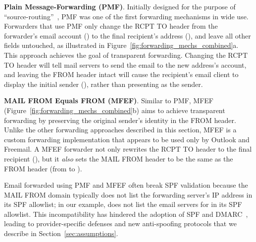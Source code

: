 
\textbf{Plain Message-Forwarding (PMF)}. Initially designed for
the purpose of ``source-routing''~\cite{Emailfor45:online}, PMF was
one of the first forwarding mechanisms in wide use.
Forwarders that use PMF only change
the \textsc{RCPT TO} header from the forwarder's email account () to the final recipient's address (), and leave all other fields
untouched,
as illustrated in Figure~\ref{fig:forwarding_mechs_combined}a.
This approach achieves the goal of transparent forwarding.
Changing the \textsc{RCPT TO} header will tell mail servers to send the email to the new address's account, and leaving the \textsc{FROM} header intact will
cause the recipient's email client to display the initial sender (),
rather than presenting  as the sender.


\textbf{MAIL FROM Equals FROM (MFEF)}.
Similar to PMF, MFEF (Figure~\ref{fig:forwarding_mechs_combined}b) aims to achieve transparent forwarding by preserving the original sender's identity in the \textsc{FROM} header.
Unlike the other forwarding approaches described in this section, MFEF is a custom forwarding implementation that appears to be used only by Outlook and Freemail.
A MFEF forwarder not only rewrites the \textsc{RCPT TO} header to the final recipient (), but it \emph{also} sets the \textsc{MAIL FROM}
header to be the same as the \textsc{FROM} header (from  to ).

Email forwarded using PMF and MFEF often break SPF validation because the \textsc{MAIL FROM} domain typically does not list the forwarding server's IP address in its SPF allowlist;
in our example,  does not list the email servers for  in its SPF allowlist.
This incompatibility has hindered the adoption of SPF and DMARC~\cite{hutowardsunderstanding},
leading to provider-specific defenses and new anti-spoofing protocols that we describe in Section~\ref{sec:assumptions}.

